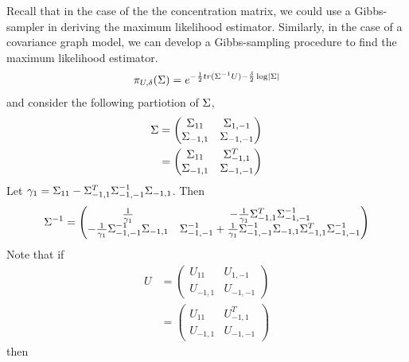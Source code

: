 \documentclass[12pt, leqno]{article}
\providecommand{\abs}[1]{\lvert#1\rvert}
\def\s{\ensuremath\Sigma}
\begin{document}
Recall that in the case of the the concentration matrix, we could use a Gibbs-sampler
in deriving the maximum likelihood estimator. Similarly, in the
case of a covariance graph model, we can develop a Gibbs-sampling
procedure to find the maximum likelihood estimator. 
\begin{align*}
\pi_{U,\delta}(\s) = e^{-\frac{1}{2}tr(\s^{-1}U)-\frac{\delta}{2} \log \abs{\s}}
\end{align*}
and consider the following partiotion of $\s$,
\begin{align*}
\s &= \begin{pmatrix} \s_{11} & \s_{1,-1}\\
\s_{-1,1} & \s_{-1,-1}
\end{pmatrix} \\
&= \begin{pmatrix} \s_{11} & \s_{-1,1}^{T}\\
\s_{-1,1} & \s_{-1,-1}
\end{pmatrix}
\end{align*}
Let $\gamma_1 =  \s_{11} - \s_{-1,1}^T \s_{-1,-1}^{-1} \s_{-1,1} $.
Then 
\begin{align*}
\s^{-1} = \begin{pmatrix} \frac{1}{\gamma_1} & -\frac{1}{\gamma_1}\s_{-1,1}^T\s_{-1,-1}^{-1} \\
- \frac{1}{\gamma_1}\s_{-1,-1}^{-1}\s_{-1,1} & \s_{-1,-1}^{-1} + \frac{1}{\gamma_1}\s_{-1,-1}^{-1}\s_{-1,1}\s_{-1,1}^T\s_{-1,-1}^{-1}
\end{pmatrix}
\end{align*}
Note that if 
\begin{align*}
U &= \begin{pmatrix} U_{11} & U_{1,-1}\\
U_{-1,1} & U_{-1,-1}
\end{pmatrix} \\
&= \begin{pmatrix} U_{11} & U_{-1,1}^T\\
U_{-1,1} & U_{-1,-1}
\end{pmatrix} 
\end{align*}
then 
\end{document}
